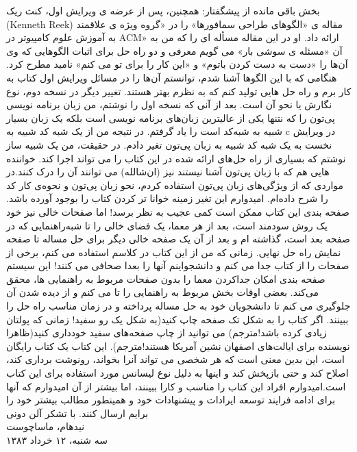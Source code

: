 \documentclass{book}
\begin{document}
بخش باقی مانده از پیشگفتار:
همچنین، پس از عرضه ی ویرایش اول، کنث ریک (Kenneth Reek) مقاله ی «الگوهای طراحی سمافورها» را در «گروه ویژه ی علاقمند به آموزش علوم کامپیوتر در ACM» ارائه داد. او در این مقاله مسأله ای را که من به آن «مسئله ی سوشی بار» می گویم معرفی و دو راه حل برای اثبات الگوهایی که وی آن‌ها را «دست به دست کردن باتوم» و «این کار را برای تو می کنم» نامید مطرح کرد. هنگامی که با این الگوها آشنا شدم، توانستم آن‌ها را در مسائل ویرایش اول کتاب به کار برم و راه حل هایی تولید کنم که به نظرم بهتر هستند.
تغییر دیگر در نسخه دوم، نوع نگارش یا نحو آن است. بعد از آنی که نسخه اول را نوشتم، من زبان برنامه نویسی پی‌تون را که نتنها یکی از عالیترین زبان‌های برنامه نویسی است بلکه یک زبان بسیار شبیه به شبه‌کد است را یاد گرفتم. در نتیجه من از یک شبه کد شبیه به c در ویرایش نخست به یک شبه کد شبیه به زبان پی‌تون تغیر دادم. در حقیقت، من یک شبیه ساز نوشتم که بسیاری از راه حل‌های ارائه شده در این کتاب را می تواند اجرا کند. خواننده هایی هم که با زبان پی‌تون آشنا نیستند نیز (ان‌شالله) می توانند آن را درک کنند.در مواردی که از ویژگی‌های زبان پی‌تون استفاده کردم، نحو زبان پی‌تون و نحوه‌ی کار کد را شرح داده‌ام. امیدوارم این تغیر زمینه خوانا تر کردن کتاب را بوجود آورده باشد. صفحه بندی این کتاب ممکن است کمی عجیب به نظر برسد! اما صفحات خالی نیز خود یک روش سودمند است، بعد از هر معما، یک فضای خالی را تا شبه‌راهنمایی که در صفحه بعد است، گذاشته ام و بعد از آن یک صفحه خالی دیگر برای حل مساله تا صفحه نمایش راه حل نهایی. زمانی که من از این کتاب در کلاسم استفاده می کنم، برخی از صفحات را از کتاب جدا می کنم و دانشجواینم آنها را بعدا صحافی می کنند! این سیستم صفحه بندی امکان جداکردن معما را بدون صفحات مربوط به راهنمایی ها، محقق می‌کند. بعضی اوقات بخش مربوط به راهنمایی را تا می کنم و از دیده شدن آن جلوگیری می کنم تا دانشجویان خود به حل مساله پرداخته و در زمان مناسب راه حل را ببینند. اگر کتاب را به شکل تک صفحه چاپ کنید(به شکل یک رو سفید! زمانی که پولتان زیادی کرده باشد!مترجم) می توانید از چاپ صفحه‌های سفید خودداری کنید(ظاهرا نویسنده برای ایالت‌های اصفهان نشین آمریکا هستند!مترجم). 
این کتاب یک کتاب رایگان است، این بدین معنی است که هر شخصی می تواند آنرا بخواند، رونوشت برداری کند، اصلاح کند و حتی بازپخش کند و اینها به دلیل نوع لیسانس مورد استفاده برای این کتاب است.امیدوارم افراد این کتاب را مناسب و کارا ببینند، اما بیشتر از آن امیدوارم که آنها برای ادامه فرایند توسعه ایرادات و پیشنهادات خود و همینطور مطالب بیشتر خود را برایم ارسال کنند.
با تشکر
\vspace{0.3in}
\noindent آلن دونی \\
\noindent نیدهام، ماساچوست \\
\noindent سه شنبه، ۱۲ خرداد ۱۳۸۳\\
\end{document}
